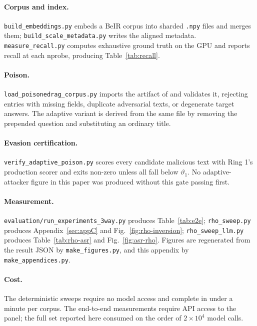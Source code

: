 \paragraph{Corpus and index.} \texttt{build\_embeddings.py} embeds a BeIR corpus
into sharded \texttt{.npy} files and merges them; \texttt{build\_scale\_metadata.py}
writes the aligned metadata. \texttt{measure\_recall.py} computes exhaustive
ground truth on the GPU and reports recall at each $\mathrm{nprobe}$, producing
Table~\ref{tab:recall}.

\paragraph{Poison.} \texttt{load\_poisonedrag\_corpus.py} imports the artifact of
\cite{zou2024poisonedrag} and validates it, rejecting entries with missing
fields, duplicate adversarial texts, or degenerate target answers. The adaptive
variant is derived from the same file by removing the prepended question and
substituting an ordinary title.

\paragraph{Evasion certification.} \texttt{verify\_adaptive\_poison.py} scores
every candidate malicious text with Ring 1's production scorer and exits
non-zero unless all fall below $\vartheta_1$. No adaptive-attacker figure in
this paper was produced without this gate passing first.

\paragraph{Measurement.} \texttt{evaluation/run\_experiments\_3way.py} produces
Table~\ref{tab:e2e}; \texttt{rho\_sweep.py} produces Appendix~\ref{sec:appC} and
Fig.~\ref{fig:rho-inversion}; \texttt{rho\_sweep\_llm.py} produces
Table~\ref{tab:rho-asr} and Fig.~\ref{fig:asr-rho}. Figures are regenerated from
the result JSON by \texttt{make\_figures.py}, and this appendix by
\texttt{make\_appendices.py}.

\paragraph{Cost.} The deterministic sweeps require no model access and complete
in under a minute per corpus. The end-to-end measurements require API access to
the panel; the full set reported here consumed on the order of $2\times10^4$
model calls.

